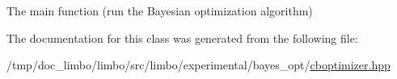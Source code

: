The main function (run the Bayesian optimization algorithm) 



The documentation for this class was generated from the following file\+:\begin{DoxyCompactItemize}
\item 
/tmp/doc\+\_\+limbo/limbo/src/limbo/experimental/bayes\+\_\+opt/\hyperlink{cboptimizer_8hpp}{cboptimizer.\+hpp}\end{DoxyCompactItemize}
